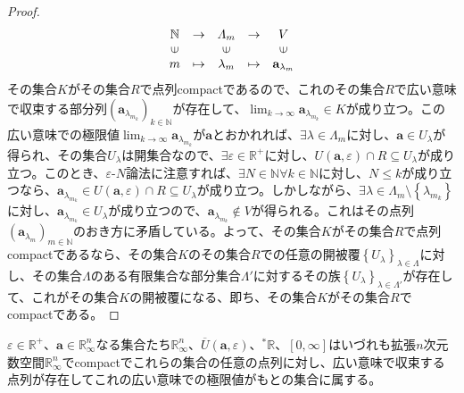 \documentclass[dvipdfmx]{jsarticle}
\begin{document}
\begin{proof}
\begin{align*}
\begin{matrix}
\mathbb{N} & \rightarrow & \varLambda_{m} & \rightarrow & V \\
\text{\rotatebox[origin=c]{90}{$\in$}} & & \text{\rotatebox[origin=c]{90}{$\in$}} & & \text{\rotatebox[origin=c]{90}{$\in$}} \\
m & \mapsto & \lambda_{m} & \mapsto & \mathbf{a}_{\lambda_{m}} \\
\end{matrix}
\end{align*}
その集合$K$がその集合$R$で点列compactであるので、これのその集合$R$で広い意味で収束する部分列$\left( \mathbf{a}_{\lambda_{m_{k}}} \right)_{k \in \mathbb{N}}$が存在して、$\lim_{k \rightarrow \infty}\mathbf{a}_{\lambda_{m_{k}}} \in K$が成り立つ。この広い意味での極限値$\lim_{k \rightarrow \infty}\mathbf{a}_{\lambda_{m_{k}}}$が$\mathbf{a}$とおかれれば、$\exists\lambda \in \varLambda_{m}$に対し、$\mathbf{a} \in U_{\lambda}$が得られ、その集合$U_{\lambda}$は開集合なので、$\exists\varepsilon \in \mathbb{R}^{+}$に対し、$U\left( \mathbf{a},\varepsilon \right) \cap R \subseteq U_{\lambda}$が成り立つ。このとき、$\varepsilon$-$N$論法に注意すれば、$\exists N \in \mathbb{N}\forall k \in \mathbb{N}$に対し、$N \leq k$が成り立つなら、$\mathbf{a}_{\lambda_{m_{k}}} \in U\left( \mathbf{a},\varepsilon \right) \cap R \subseteq U_{\lambda}$が成り立つ。しかしながら、$\exists\lambda \in \varLambda_{m} \setminus \left\{ \lambda_{m_{k}} \right\}$に対し、$\mathbf{a}_{\lambda_{m_{k}}} \in U_{\lambda}$が成り立つので、$\mathbf{a}_{\lambda_{m_{k}}} \notin V$が得られる。これはその点列$\left( \mathbf{a}_{\lambda_{m}} \right)_{m \in \mathbb{N}}$のおき方に矛盾している。よって、その集合$K$がその集合$R$で点列compactであるなら、その集合$K$のその集合$R$での任意の開被覆$\left\{ U_{\lambda} \right\}_{\lambda \in \varLambda}$に対し、その集合$\varLambda$のある有限集合な部分集合$\varLambda'$に対するその族$\left\{ U_{\lambda} \right\}_{\lambda \in \varLambda'}$が存在して、これがその集合$K$の開被覆になる、即ち、その集合$K$がその集合$R$でcompactである。
\end{proof}
\begin{thm}\label{4.1.7.4}
$\varepsilon \in \mathbb{R}^{+}$、$\mathbf{a} \in \mathbb{R}_{\infty}^{n}$なる集合たち$\mathbb{R}_{\infty}^{n}$、$\overline{U}\left( \mathbf{a},\varepsilon \right)$、${}^{*}\mathbb{R}$、$[ 0,\infty]$はいづれも拡張$n$次元数空間$\mathbb{R}_{\infty}^{n}$でcompactでこれらの集合の任意の点列に対し、広い意味で収束する点列が存在してこれの広い意味での極限値がもとの集合に属する。
\end{thm}
\end{document}
